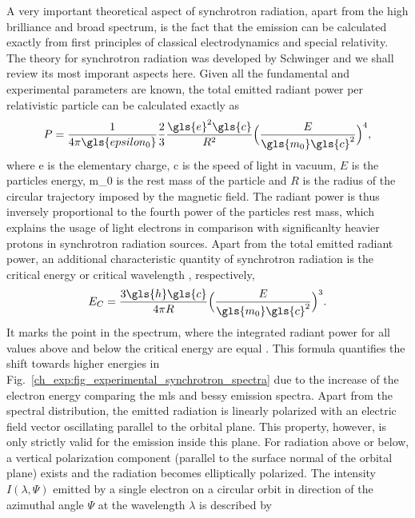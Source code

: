 A very important theoretical aspect of synchrotron radiation, apart from the high brilliance and broad spectrum, is the fact that the emission can be calculated exactly from first principles of classical electrodynamics and special relativity. The theory for synchrotron radiation was developed by Schwinger \cite{schwinger_classical_1949} and we shall review its most imporant aspects here. Given all the fundamental and experimental parameters are known, the total emitted radiant power per relativistic particle can be calculated exactly as
\begin{align}
 P = \frac{1}{4 \pi \gls{epsilon_0}} \frac{2}{3} \frac{\gls{e}^2 \gls{c}}{R^2}\Big( \frac{E}{\gls{m_0} \gls{c}^2}\Big)^4 \text{,} \label{ch_exp:schwinger_equation_total_power}
\end{align}
where \gls{e} is the elementary charge, \gls{c} is the speed of light in vacuum, $E$ is the particles energy, \gls{m_0} is the rest mass of the particle and $R$ is the radius of the circular trajectory imposed by the magnetic field. The radiant power is thus inversely proportional to the fourth power of the particles rest mass, which explains the usage of light electrons in comparison with significanlty heavier protons in synchrotron radiation sources. Apart from the total emitted radiant power, an additional characteristic quantity of synchrotron radiation is the critical energy or critical wavelength \cite{schwinger_classical_1949}, respectively,
\begin{align}
 E_C = \frac{3 \gls{h} \gls{c}}{4 \pi R} \Big( \frac{E}{\gls{m_0} \gls{c}^2}\Big)^3 \text{.} \label{ch_exp:characteristic_energy}
\end{align}
It marks the point in the spectrum, where the integrated radiant power for all values above and below the critical energy are equal \cite{balerna_introduction_2015}. This formula quantifies the shift towards higher energies in Fig.~\ref{ch_exp:fig_experimental_synchrotron_spectra} due to the increase of the electron energy comparing the \gls{mls} and \gls{bessy} emission spectra. Apart from the spectral distribution, the emitted radiation is linearly polarized with an electric field vector oscillating parallel to the orbital plane. This property, however, is only strictly valid for the emission inside this plane. For radiation above or below, a vertical polarization component (parallel to the surface normal of the orbital plane) exists and the radiation becomes elliptically polarized. The intensity $I(\lambda,\Psi)$ emitted by a single electron on a circular orbit in direction of the azimuthal angle $\Psi$ at the wavelength $\lambda$ is described by
